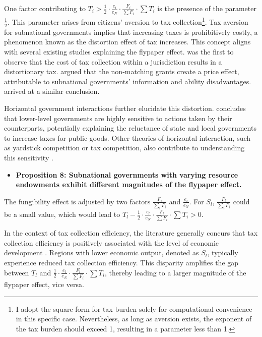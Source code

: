 \documentclass[man]{apa7}
\begin{document}
One factor contributing to $T_i>\frac{1}{2}\cdot \frac{e_i}{e_N}\cdot \frac{F_i}{\sum F_i} \cdot \sum T_i$ is the presence of the parameter $\frac{1}{2}$. This parameter arises from citizens' aversion to tax collection\footnote{I adopt the square form for tax burden solely for computational convenience in this specific case. Nevertheless, as long as aversion exists, the exponent of the tax burden should exceed 1, resulting in a parameter less than 1.}. Tax aversion for subnational governments implies that increasing taxes is prohibitively costly, a phenomenon known as the distortion effect of tax increases. This concept aligns with several existing studies explaining the flypaper effect. \Textcite{hamilton1986flypaper} was the first to observe that the cost of tax collection within a jurisdiction results in a distortionary tax. \Textcite{dahlby2016stimulative} argued that the non-matching grants create a price effect, attributable to subnational governments' information and ability disadvantages. \Textcite{vegh2016unsticking} arrived at a similar conclusion.%

Horizontal government interactions further elucidate this distortion. \Textcite{brueckner2003strategic} concludes that lower-level governments are highly sensitive to actions taken by their counterparts, potentially explaining the reluctance of state and local governments to increase taxes for public goods. Other theories of horizontal interaction, such as yardstick competition or tax competition, also contribute to understanding this sensitivity \parencite{shleifer1985theory,revelli2006performance}.%

\begin {itemize}
\item \textbf{Proposition 8: Subnational governments with varying resource endowments exhibit different magnitudes of the flypaper effect.}
\end{itemize}

The fungibility effect is adjusted by two factors $\frac{F_i}{\sum_i F_i}$ and $\frac{e_i}{e_N}$. For $S_l$, $\frac{F_l}{\sum_i F_i}$ could be a small value, which would lead to $T_l-\frac{1}{2}\cdot \frac{e_l}{e_N}\cdot \frac{F_l}{\sum F_i} \cdot \sum T_i>0$.

In the context of tax collection efficiency, the literature generally concurs that tax collection efficiency is positively associated with the level of economic development \cite{arvate2008efficiency,mattos2011flypaper}. Regions with lower economic output, denoted as $S_l$, typically experience reduced tax collection efficiency. This disparity amplifies the gap between $T_l$ and $\frac{1}{2}\cdot \frac{e_l}{e_N}\cdot \frac{F_l}{\sum F_i} \cdot \sum T_i$, thereby leading to a larger magnitude of the flypaper effect, vice versa.%
\end{document}
